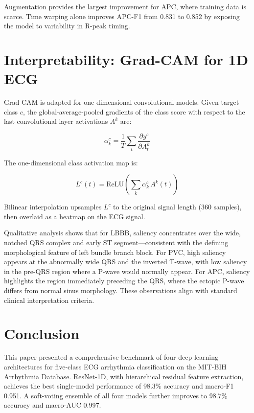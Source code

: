 \documentclass[conference]{IEEEtran}
\begin{document}
Augmentation provides the largest improvement for APC, where training data is scarce. Time warping alone improves APC-F1 from 0.831 to 0.852 by exposing the model to variability in R-peak timing.

\section{Interpretability: Grad-CAM for 1D ECG}

Grad-CAM \cite{b6} is adapted for one-dimensional convolutional models. Given target class $c$, the global-average-pooled gradients of the class score with respect to the last convolutional layer activations $A^k$ are:

\begin{equation}
\alpha^c_k = \frac{1}{T}\sum_t \frac{\partial y^c}{\partial A^k_t}
\end{equation}

The one-dimensional class activation map is:

\begin{equation}
L^c(t) = \text{ReLU}\!\left(\sum_k \alpha^c_k\, A^k(t)\right)
\end{equation}

Bilinear interpolation upsamples $L^c$ to the original signal length (360 samples), then overlaid as a heatmap on the ECG signal.

Qualitative analysis shows that for LBBB, saliency concentrates over the wide, notched QRS complex and early ST segment---consistent with the defining morphological feature of left bundle branch block. For PVC, high saliency appears at the abnormally wide QRS and the inverted T-wave, with low saliency in the pre-QRS region where a P-wave would normally appear. For APC, saliency highlights the region immediately preceding the QRS, where the ectopic P-wave differs from normal sinus morphology. These observations align with standard clinical interpretation criteria.

\section{Conclusion}

This paper presented a comprehensive benchmark of four deep learning architectures for five-class ECG arrhythmia classification on the MIT-BIH Arrhythmia Database. ResNet-1D, with hierarchical residual feature extraction, achieves the best single-model performance of 98.3\% accuracy and macro-F1 0.951. A soft-voting ensemble of all four models further improves to 98.7\% accuracy and macro-AUC 0.997.
\end{document}
